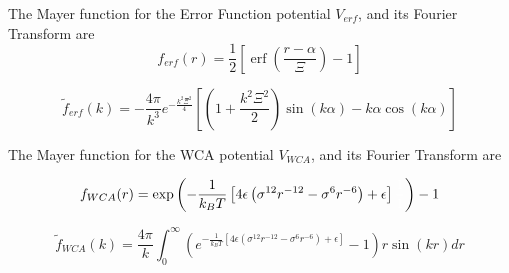 \documentclass[double,12pt]{beavtex}
\begin{document}
The Mayer function for the Error Function potential $V_{erf}$, and its Fourier Transform are
\begin{equation}f_{erf}(r)=\frac{1}{2}\left[\operatorname{erf}\left(\frac{r-\alpha}{\Xi}\right)-1\right]\end{equation} 

\begin{equation}\widetilde{f}_{erf}(k)=-\frac{4\pi}{k^3}e^{-\frac{k^2\Xi^2}{4}}\left[\left(1+\frac{k^2\Xi^2}{2}\right)\sin(k\alpha)-k\alpha\cos(k\alpha)\right]\end{equation} 

The Mayer function for the WCA potential $V_{WCA}$, and its Fourier Transform are


\begin{equation}f_{WCA}(r)=\operatorname{exp}\left(-\frac{1}{k_BT}\left[4\epsilon\left(\sigma^{12}r^{-12}-\sigma^{6}r^{-6}\right)+\epsilon\right]\color{white}\frac{1}{1}\color{black}\right)-1\end{equation} 

\begin{equation}\widetilde{f}_{WCA}(k)=\frac{4\pi}{k}\int_0^{\infty}{\left(e^{-\frac{1}{k_BT}\left[4\epsilon\left(\sigma^{12}r^{-12}-\sigma^{6}r^{-6}\right)+\epsilon\right]}-1\right) r\sin(kr)dr}\end{equation} 



\[{}\]
\end{document}
